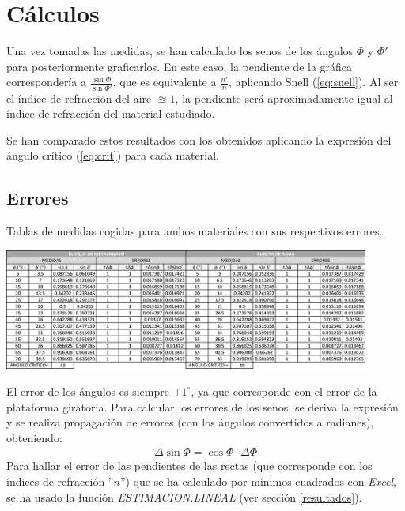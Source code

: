 \documentclass[fleqn,usenatbib,openbib]{mnras}
\begin{document}
\section{Cálculos}

Una vez tomadas las medidas, se han calculado los senos de los ángulos $\Phi$ y $\Phi'$ para posteriormente graficarlos. En este caso, la pendiente de la gráfica correspondería a $\frac{\sin\Phi}{\sin\Phi'}$, que es equivalente a $\frac{n'}{n}$, aplicando Snell (\ref{eq:snell}). Al ser el índice de refracción del aire $\approxeq 1$, la pendiente será aproximadamente igual al índice de refracción del material estudiado. 

Se han comparado estos resultados con los obtenidos aplicando la expresión del ángulo crítico (\ref{eq:crit}) para cada material.

\subsection{Errores}

\begin{table} %
    \centering
    \caption{Tablas de medidas cogidas para ambos materiales con sus respectivos errores.}
    \includegraphics[width=0.9\textwidth]{images/tables.png}
    \label{tab:tables}
\end{table}

El error de los ángulos es siempre $\pm 1^{\circ}$, ya que corresponde con el error de la plataforma giratoria. Para calcular los errores de los senos, se deriva la expresión y se realiza propagación de errores (con los ángulos convertidos a radianes), obteniendo:
\begin{gather*}
    \Delta \sin\Phi = \cos\Phi\cdot\Delta\Phi
\end{gather*}
Para hallar el error de las pendientes de las rectas (que corresponde con los índices de refracción ''$n$'') que se ha calculado por mínimos cuadrados con \textit{Excel}, se ha usado la función \textit{ESTIMACION.LINEAL} (ver sección \ref{resultados}).
\end{document}
